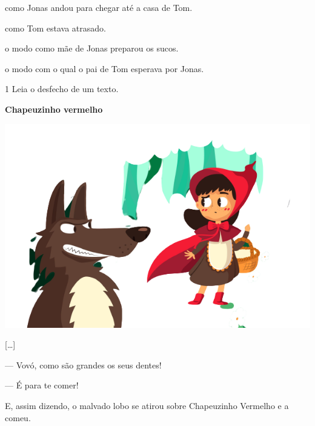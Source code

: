 \begin{escolha}
\item como Jonas andou para chegar até a casa de Tom.

\item como Tom estava atrasado.

\item o modo como mãe de Jonas preparou os sucos.

\item o modo com o qual o pai de Tom esperava por Jonas.
\end{escolha}


\pagebreak
\vspace*{-3.4cm}

\num{1} Leia o desfecho de um texto.

\begin{myquote}
\textbf{Chapeuzinho vermelho}

\begin{center}
\includegraphics[width=\textwidth]{./media/image23j.png}
\end{center}

{[}\ldots{}{]}

--- Vovó, como são grandes os seus dentes!

--- É para te comer!

E, assim dizendo, o malvado lobo se atirou sobre Chapeuzinho Vermelho e a
comeu.

\end{myquote}

